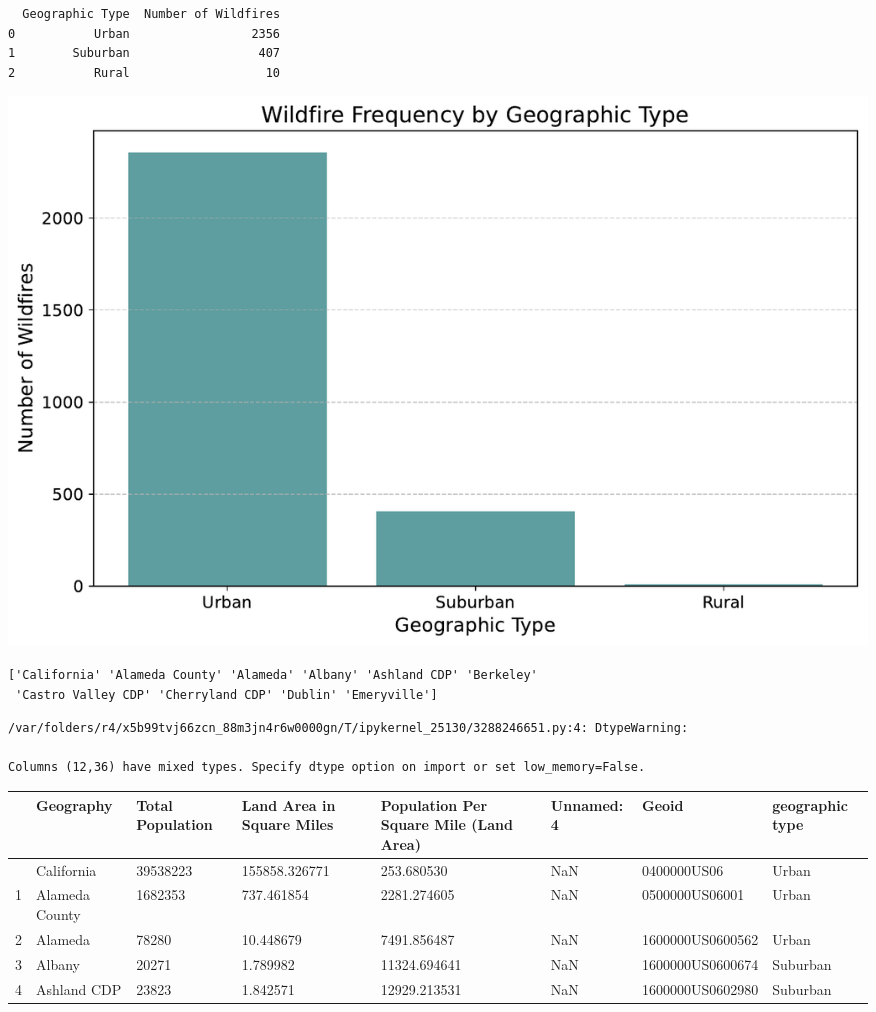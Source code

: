 \documentclass[
  letterpaper,
  DIV=11,
  numbers=noendperiod]{scrartcl}
\begin{document}
\begin{verbatim}
  Geographic Type  Number of Wildfires
0           Urban                 2356
1        Suburban                  407
2           Rural                   10
\end{verbatim}

\includegraphics{Final Writeup_files/figure-pdf/cell-7-output-2.pdf}

\begin{verbatim}
['California' 'Alameda County' 'Alameda' 'Albany' 'Ashland CDP' 'Berkeley'
 'Castro Valley CDP' 'Cherryland CDP' 'Dublin' 'Emeryville']
\end{verbatim}

\begin{verbatim}
/var/folders/r4/x5b99tvj66zcn_88m3jn4r6w0000gn/T/ipykernel_25130/3288246651.py:4: DtypeWarning:

Columns (12,36) have mixed types. Specify dtype option on import or set low_memory=False.
\end{verbatim}

\begin{longtable}[]{@{}llllllll@{}}
\toprule\noalign{}
& Geography & Total Population & Land Area in Square Miles & Population
Per Square Mile (Land Area) & Unnamed: 4 & Geoid & geographic type \\
\midrule\noalign{}
\endhead
\bottomrule\noalign{}
\endlastfoot
0 & California & 39538223 & 155858.326771 & 253.680530 & NaN &
0400000US06 & Urban \\
1 & Alameda County & 1682353 & 737.461854 & 2281.274605 & NaN &
0500000US06001 & Urban \\
2 & Alameda & 78280 & 10.448679 & 7491.856487 & NaN & 1600000US0600562 &
Urban \\
3 & Albany & 20271 & 1.789982 & 11324.694641 & NaN & 1600000US0600674 &
Suburban \\
4 & Ashland CDP & 23823 & 1.842571 & 12929.213531 & NaN &
1600000US0602980 & Suburban \\
\end{longtable}
\end{document}
